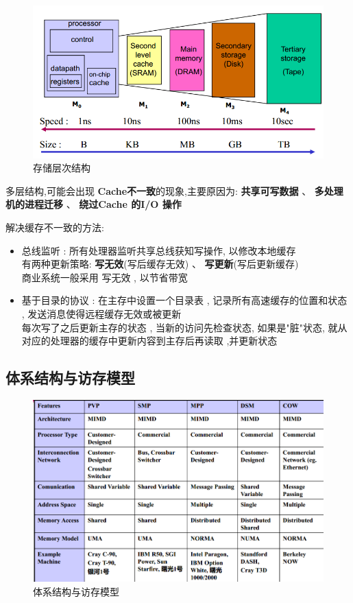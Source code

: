 \documentclass[UTF8,a4paper]{ctexart}
\begin{document}
  \begin{figure}[H]
    \centering
    \includegraphics[scale = 0.3]{assets/ParallelComputing_fe648.png}
    \caption{存储层次结构}
  \end{figure}

  多层结构,可能会出现 \textbf{Cache不一致}的现象,主要原因为:
  \textbf{共享可写数据} 、 \textbf{多处理机的进程迁移}  、 \textbf{绕过Cache 的I/O 操作}

  解决缓存不一致的方法:
  \begin{itemize}
    \item 总线监听 : 所有处理器监听共享总线获知写操作, 以修改本地缓存\\
    有两种更新策略: \textbf{写无效}(写后缓存无效) 、 \textbf{写更新}(写后更新缓存) \\
    商业系统一般采用 写无效 , 以节省带宽
    \item 基于目录的协议 : 在主存中设置一个目录表 , 记录所有高速缓存的位置和状态 , 发送消息使得远程缓存无效或被更新\\
    每次写了之后更新主存的状态 , 当新的访问先检查状态, 如果是"脏"状态, 就从对应的处理器的缓存中更新内容到主存后再读取 ,并更新状态
  \end{itemize}

  \subsection{体系结构与访存模型}
  \begin{figure}[H]
    \centering
    \includegraphics[scale = 0.3]{assets/ParallelComputing_cb9dc.png}
    \caption{体系结构与访存模型}
  \end{figure}
\end{document}
